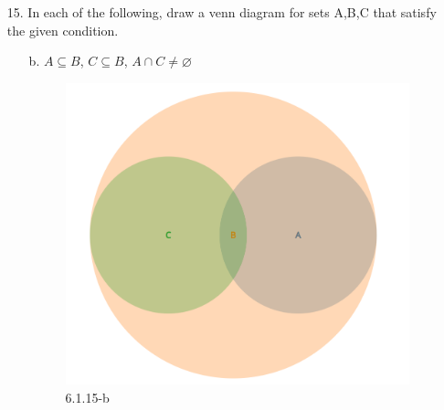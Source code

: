 \documentclass[12pt]{article}
\begin{document}
\begin{enumerate}
\begin{enumerate}
\begin{enumerate}[a.]
\begin{proof}
                            \end{proof}
                        \item $B = C$
                            \begin{proof}
                                Assume an arbitrarily chosen integer $z\in C$, it can be written as $z = 10c + 7$ for some integer $c$. Assume $z \in B$, we have the following
                                \[
                                10c+7 = 10b-3
                                \]
                                through algebra, we get
                                \[
                                10c = 10b-10
                                \]
                                and 
                                \[
                                c = b-1
                                \]
                                which also means 
                                \[
                                b=c+1
                                \]
                                We see that $z =10(c+1)-3 $ and $y = 10(b-1)+7$ and $10$ This means that for any arbitrarily chosen element in $C$, it can be written in terms of an element in $B$, and vice versa. Therefore $B \subseteq C \wedge C \subseteq B$ and this means $B=C$
                            \end{proof}
                    \end{enumerate}

                \item[15.] In each of the following, draw a venn diagram for sets A,B,C that satisfy the given condition.
                    \begin{enumerate}
                        \item[b.] $A \subseteq B$, $C \subseteq B$, $A \cap C \neq \varnothing$
                        \begin{figure}[!h]
                            \centering
                            \includegraphics[width=0.3\linewidth]{Picture Folder//HW02/6-1-15-b.png}
                            \caption{6.1.15-b}
                            \label{fig:6.1.15-b}
                        \end{figure}


\end{enumerate}
\end{enumerate}
\end{enumerate}
\end{document}
